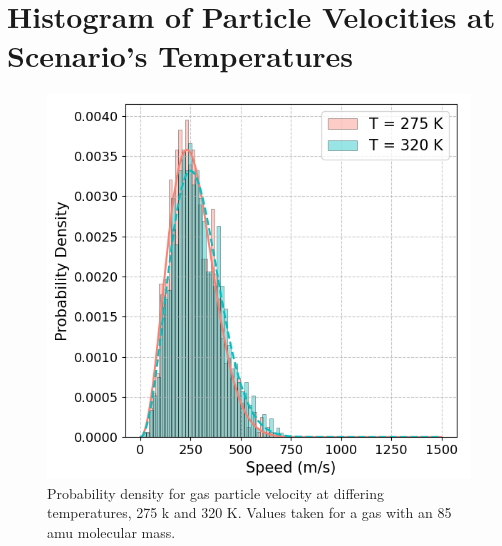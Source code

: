\documentclass[%
 reprint,
 amsmath,amssymb,
 aps,
]{revtex4-2}
\begin{document}
\section{Histogram of Particle Velocities at Scenario's Temperatures}

\begin{figure}[H]
	\caption{Probability density for gas particle velocity at differing temperatures, 275 k and 320 K. Values taken for a gas with an 85 amu molecular mass. }	
	\centering
	\includegraphics[scale=0.5]{appendix2.png}
\end{figure}

\nocite{*}

\end{document}
